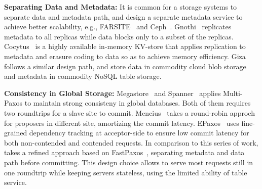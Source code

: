 
{\bf Separating Data and Metadata:}
It is common for a storage systems to separate data and metadata path, and design a separate metadata service to achieve better scalability, e.g., FARSITE~\cite{adya2002farsite} and Ceph~\cite{weil2006ceph}. Gnothi~\cite{wang2012gnothi} replicates metadata to all replicas while data blocks only to a subset of the replicas. Cocytus~\cite{zhang2016efficient} is a highly available in-memory KV-store that applies replication to metadata and erasure coding to data so as to achieve memory efficiency.
Giza follows a similar design path, and store data in commodity cloud blob storage and metadata in commodity NoSQL table storage.

{\bf Consistency in Global Storage:}
Megastore~\cite{megastore} and Spanner~\cite{Spanner} applies Multi-Paxos to 
maintain strong consisteny in global databases. Both of them requires two roundtrips 
for a slave site to commit. Mencius~\cite{Mencius} takes a round-robin approch for 
proposers in different site, amortizing the commit latency. EPaxos~\cite{EPaxos} 
uses fine-grained dependency tracking at acceptor-side to ensure low commit latency 
for both non-contended and contended requests. In comparison to this series of work, 
\name takes a refined approach based on FastPaxos~\cite{fastpaxos}, separating metadata 
and data path before committing. This design choice allows \name to serve most requests 
still in one roundtrip while keeping servers stateless, using the limited ability of 
table service. 



